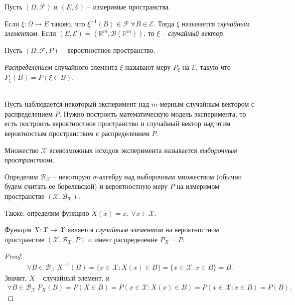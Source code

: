 Пусть $\displaystyle ( \Omega ,\mathcal{F})$ и $\displaystyle ( E,\mathcal{E})$ -- измеримые пространства.
\begin{definition}
	Если $\displaystyle \xi :\Omega \rightarrow E$ таково, что $\displaystyle \xi ^{-1}( B) \in \mathcal{F} \ \forall B\in \mathcal{E}$. Тогда $\displaystyle \xi $ называется \textit{случайным элементом}. Если $\displaystyle ( E,\mathcal{E}) =\left(\mathbb{R}^{m} ,\mathcal{B}\left(\mathbb{R}^{m}\right)\right)$, то $\displaystyle \xi $ -- \textit{случайный вектор}. 
\end{definition}
Пусть $\displaystyle ( \Omega ,\mathcal{F} ,P)$ -- вероятностное пространство.
\begin{definition}
	\textit{Распределением} случайного элемента $\displaystyle \xi $ называют меру $\displaystyle P_{\xi }$ на $\displaystyle \mathcal{E}$, такую что $\displaystyle P_{\xi }( B) =P( \xi \in B)$.
\end{definition}
\\
Пусть наблюдается некоторый эксперимент над $\displaystyle m$-мерным случайным вектором с распределением $\displaystyle P$. Нужно построить математическую модель эксперимента, то есть построить вероятностное пространство и случайный вектор над этим вероятностым пространством с распределением $\displaystyle P$.
\begin{definition}
	Множество $\displaystyle \mathcal{X}$ всевозможных исходов эксперимента называется \textit{выборочным пространством.}
\end{definition}
    Определим $\displaystyle \mathcal{B}_{\mathcal{X}}$ -- некоторую $\displaystyle \sigma $-алгебру над выборочным множеством (обычно будем считать ее борелевской) и вероятностную меру $\displaystyle P$ на измеримом пространстве $\displaystyle (\mathcal{X} ,\mathcal{B}_{\mathcal{X}})$.
    
    Также, определим функцию $\displaystyle X( x) =x,\ \forall x\in \mathcal{X}$.
\begin{proposition}
	Функция $\displaystyle X:\mathcal{X}\rightarrow \mathcal{X}$ является \textit{случайным элементом} на вероятностном пространстве $\displaystyle (\mathcal{X} ,\mathcal{B}_{\mathcal{X}} ,P)$ и имеет распределение $\displaystyle P_{X} =P$.
\end{proposition}
\begin{proof}
    \begin{gather*}
        \forall B\in \mathcal{B}_{\mathcal{X}} \ X^{-1}( B) =\{x\in \mathcal{X} :X( x) \in B\} =\{x\in \mathcal{X} :x\in B\} = B.
    \end{gather*}
    Значит, $X$ -- случайный элемент, и
    \begin{gather*}
        \forall B\in \mathcal{B}_{\mathcal{X}} \ P_{X}( B) =P( X\in B) =P( x\in \mathcal{X} :X( x) \in B) =P( x\in \mathcal{X} :x\in B) =P( B).
    \end{gather*}
\end{proof}

